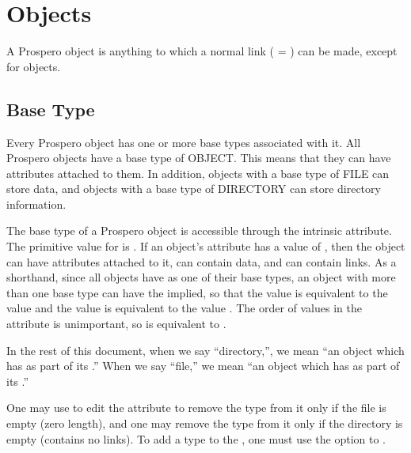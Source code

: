 \section{Objects}

A Prospero object is anything to which a normal link ( =
) can be made, except for  objects.  

\subsection{Base Type\label{base type}}

Every Prospero object has one or more base types associated with it.  
All Prospero objects have a base type of OBJECT.  This means that they
can have attributes attached to them.  In addition, objects with a base
type of FILE can store data, and objects with a base type of DIRECTORY
can store directory information. 

\begin{sloppypar}
The base type of a Prospero object is accessible
through the  intrinsic attribute.  The primitive
value for  is .  If an object's
 attribute has a value of %
, 
then the object can have attributes attached to it, can contain data,
and can contain links.  As a shorthand, since all objects have
 as one of their base types, an object with more than one
base type can have the  implied, so that the 
value  is equivalent to the value
 and the value  is equivalent to the 
value .  The order of values in the 
attribute is unimportant, so  is equivalent to
.
\end{sloppypar}

In the rest of this document, when
we say ``directory,'', we mean ``an object which has
 as part of its .''  When we say ``file,''
we mean ``an object which has  as part of its .''

One may use  to edit the 
attribute to remove the  type from it only if the file is
empty (zero length), and one may remove the  type from
it only if the directory is empty (contains no links).  To add a type
to the , one must use the  option to
.  

